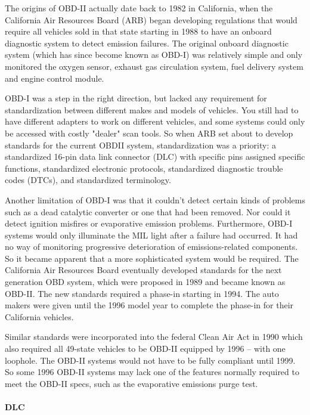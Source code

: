 \documentclass[11pt]{article}
\begin{document}
\begin{displayquote}
	The origins of OBD-II actually date back to 1982 in California, when the California Air Resources Board (ARB) began developing regulations that would require all vehicles sold in that state starting in 1988 to have an onboard diagnostic system to detect emission failures. The original onboard diagnostic system (which has since become known as OBD-I) was relatively simple and only monitored the oxygen sensor, exhaust gas circulation system, fuel delivery system and engine control module.
	
	OBD-I was a step in the right direction, but lacked any requirement for standardization between different makes and models of vehicles. You still had to have different adapters to work on different vehicles, and some systems could only be accessed with costly "dealer" scan tools. So when ARB set about to develop standards for the current OBDII system, standardization was a priority: a standardized 16-pin data link connector (DLC) with specific pins assigned specific functions, standardized electronic protocols, standardized diagnostic trouble codes (DTCs), and standardized terminology.
	
	Another limitation of OBD-I was that it couldn't detect certain kinds of problems such as a dead catalytic converter or one that had been removed. Nor could it detect ignition misfires or evaporative emission problems. Furthermore, OBD-I systems would only illuminate the MIL light after a failure had occurred. It had no way of monitoring progressive deterioration of emissions-related components. So it became apparent that a more sophisticated system would be required. The California Air Resources Board eventually developed standards for the next generation OBD system, which were proposed in 1989 and became known as OBD-II. The new standards required a phase-in starting in 1994. The auto makers were given until the 1996 model year to complete the phase-in for their California vehicles.
	
	Similar standards were incorporated into the federal Clean Air Act in 1990 which also required all 49-state vehicles to be OBD-II equipped by 1996 -- with one loophole. The OBD-II systems would not have to be fully compliant until 1999. So some 1996 OBD-II systems may lack one of the features normally required to meet the OBD-II specs, such as the evaporative emissions purge test.
\end{displayquote}

\paragraph{DLC}
\end{document}

